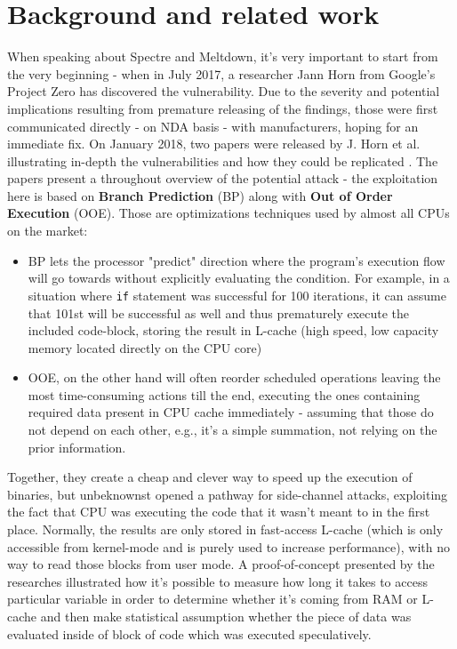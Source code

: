 \documentclass{csfourzero}
\begin{document}
\section{Background and related work}
\label{sec:lit}

When speaking about Spectre and Meltdown, it's very important to start from the very beginning - when in July 2017, a researcher Jann Horn from Google's Project Zero has discovered the vulnerability. Due to the severity and potential implications resulting from premature releasing of the findings, those were first communicated directly - on NDA basis - with manufacturers, hoping for an immediate fix. On January 2018, two papers were released by J. Horn et al. illustrating in-depth the vulnerabilities and how they could be replicated \cite{Lipp2018meltdown, Kocher2018spectre}. The papers present a throughout overview of the potential attack - the exploitation here is based on \textbf{Branch Prediction} (BP) along with \textbf{Out of Order Execution} (OOE). Those are optimizations techniques used by almost all CPUs on the market:

\begin{itemize}[noitemsep]
  \item BP lets the processor "predict" direction where the program's execution flow will go towards without explicitly evaluating the condition. For example, in a situation where \lstinline{if} statement was successful for 100 iterations, it can assume that 101st will be successful as well and thus prematurely execute the included code-block, storing the result in L-cache (high speed, low capacity memory located directly on the CPU core)  
  \item OOE, on the other hand will often reorder scheduled operations leaving the most time-consuming actions till the end, executing the ones containing required data present in CPU cache immediately - assuming that those do not depend on each other, e.g., it's a simple summation, not relying on the prior information.
\end{itemize}

Together, they create a cheap and clever way to speed up the execution of binaries, but unbeknownst opened a pathway for side-channel attacks, exploiting the fact that CPU was executing the code that it wasn't meant to in the first place. Normally, the results are only stored in fast-access L-cache (which is only accessible from kernel-mode and is purely used to increase performance), with no way to read those blocks from user mode. A proof-of-concept presented by the researches \cite{Kocher2018spectre} illustrated how it's possible to measure how long it takes to access particular variable in order to determine whether it's coming from RAM or L-cache and then make statistical assumption whether the piece of data was evaluated inside of block of code which was executed speculatively. 
\end{document}
